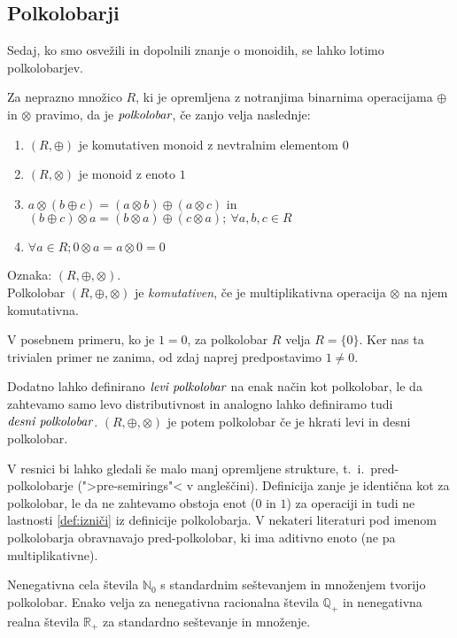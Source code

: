 \documentclass[mat1]{fmfdelo}
\newcommand{\N}{\mathbb{N}}
\newcommand{\No}{\N_0}
\newcommand{\Pplus}[1]{\mathbb{#1}_{+}}
\newcommand{\pojem}[1]{\ensuremath{\emph{#1}}}
\begin{document}
\subsection{Polkolobarji} \label{subsect:semiring}
Sedaj, ko smo osvežili in dopolnili znanje o monoidih, se lahko lotimo polkolobarjev.
\begin{definicija}
	Za neprazno množico $R$, ki je opremljena z notranjima binarnima operacijama $\oplus$ in $\otimes$ pravimo, da je \pojem{polkolobar}, če zanjo velja naslednje:
	\begin{enumerate}
		\item $(R, \oplus)$ je komutativen monoid z nevtralnim elementom $0$
		\item $(R, \otimes)$ je monoid z enoto $1$
		\item $a\otimes(b \oplus c) = (a\otimes b) \oplus (a\otimes c)$ in $(b \oplus c)\otimes a = (b\otimes a) \oplus (c\otimes a);~\forall a, b, c\in R$
		\item  \label{def:izniči} $\forall a\in R; 0 \otimes a = a\otimes 0 = 0$
	\end{enumerate}
	Oznaka: $(R, \oplus, \otimes)$. \\ Polkolobar $(R, \oplus, \otimes)$ je \textit{komutativen}, če je multiplikativna operacija $\otimes$ na njem komutativna.
\end{definicija}
V posebnem primeru, ko je $1 = 0$, za polkolobar $R$ velja $R = \{0\}$. Ker nas ta trivialen primer ne zanima, od zdaj naprej predpostavimo $1 \neq 0$.
\begin{opomba}
	Dodatno lahko definirano \pojem{levi polkolobar} na enak način kot polkolobar, le da zahtevamo samo levo distributivnost in analogno lahko definiramo tudi \pojem{desni polkolobar}. $(R,\oplus, \otimes)$ je potem polkolobar če je hkrati levi in desni polkolobar.
\end{opomba}
\begin{opomba}
	V resnici bi lahko gledali še malo manj opremljene strukture, t.~i.~pred-polkolobarje (">pre-semirings"< v angleščini). Definicija zanje je identična kot za polkolobar, le da ne zahtevamo obstoja enot ($0$ in $1$) za operaciji in tudi ne lastnosti \ref{def:izniči} iz definicije polkolobarja. V nekateri literaturi pod imenom polkolobarja obravnavajo pred-polkolobar, ki ima aditivno enoto (ne pa multiplikativne).
\end{opomba}
\begin{zgled}
	Nenegativna cela števila $\No$ s standardnim seštevanjem in množenjem tvorijo polkolobar. Enako velja za nenegativna racionalna števila $\Pplus{Q}$ in nenegativna realna števila $\Pplus{R}$ za standardno seštevanje in množenje.
\end{zgled}
\end{document}

